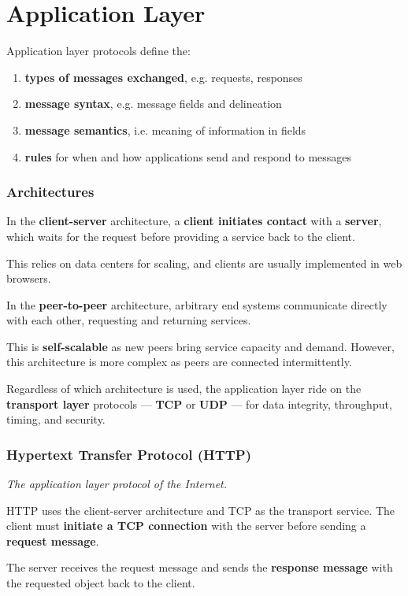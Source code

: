 \part{Application Layer}
Application layer protocols define the:
\begin{enumerate}
    \item \textbf{types of messages exchanged}, e.g. requests, responses
    \item \textbf{message syntax}, e.g. message fields and delineation
    \item \textbf{message semantics}, i.e. meaning of information in fields
    \item \textbf{rules} for when and how applications send and respond to messages
\end{enumerate}


\section{Architectures}
In the \textbf{client-server} architecture, a \textbf{client initiates contact} with a \textbf{server},
which waits for the request before providing a service back to the client.

This relies on data centers for scaling, and clients are usually implemented in web browsers.

In the \textbf{peer-to-peer} architecture, arbitrary end systems communicate directly with each other,
requesting and returning services.

This is \textbf{self-scalable} as new peers bring service capacity and demand.
However, this architecture is more complex as peers are connected intermittently.

Regardless of which architecture is used, the application layer ride on the \textbf{transport layer} protocols
--- \textbf{TCP} or \textbf{UDP} --- for data integrity, throughput, timing, and security.


\section{Hypertext Transfer Protocol (HTTP)}
\emph{The application layer protocol of the Internet.}

HTTP uses the client-server architecture and TCP as the transport service.
The client must \textbf{initiate a TCP connection} with the server before sending a \textbf{request message}.

The server receives the request message and sends the \textbf{response message} with the requested object
back to the client.

